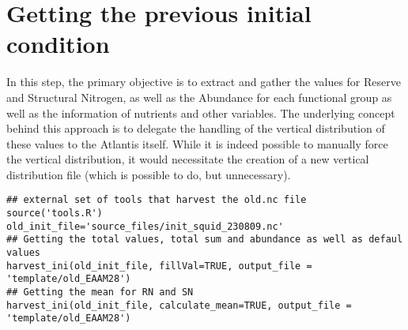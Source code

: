 \documentclass[a4paper]{article}
\begin{document}
\section{Getting the previous initial condition}
\label{sec:orgd0b3593}
In this step, the primary objective is to extract and gather the values for Reserve
and Structural Nitrogen, as well as the Abundance for each functional group as well as the information of nutrients and other variables. The
underlying concept behind this approach is to delegate the handling of the vertical
distribution of these values to the Atlantis itself. While it is indeed possible to
manually force the vertical distribution, it would necessitate the creation of a new
vertical distribution file (which is possible to do, but unnecessary).
\begin{verbatim}
## external set of tools that harvest the old.nc file
source('tools.R')
old_init_file='source_files/init_squid_230809.nc'
## Getting the total values, total sum and abundance as well as defaul values
harvest_ini(old_init_file, fillVal=TRUE, output_file = 'template/old_EAAM28')
## Getting the mean for RN and SN
harvest_ini(old_init_file, calculate_mean=TRUE, output_file = 'template/old_EAAM28')
\end{verbatim}
\end{document}
